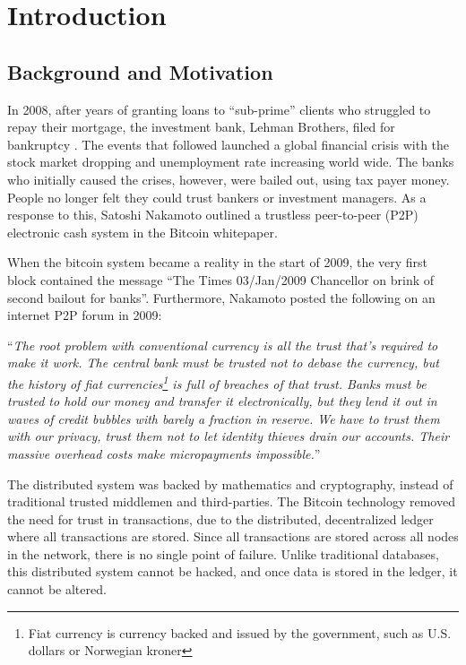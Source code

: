 \chapter{Introduction}
\section{Background and Motivation}
In 2008, after years of granting loans to \enquote{sub-prime} clients who struggled to repay their mortgage, the investment bank, Lehman Brothers, filed for bankruptcy \cite{lehman}. The events that followed launched a global financial crisis with the stock market dropping and unemployment rate increasing world wide. The banks who initially caused the crises, however, were bailed out, using tax payer money. People no longer felt they could trust bankers or investment managers. As a response to this, Satoshi Nakamoto outlined a trustless peer-to-peer (P2P) electronic cash system in the Bitcoin whitepaper. 

When the bitcoin system became a reality in the start of 2009, the very first block contained the message \enquote{The Times 03/Jan/2009 Chancellor on brink of second bailout for banks}. Furthermore, Nakamoto posted the following on an internet P2P forum \cite{nakamoto_trust} in 2009: 

\enquote{\textit{The root problem with conventional currency is all the trust that's required to make it work. The central bank must be trusted not to debase the currency, but the history of fiat currencies\footnote{Fiat currency is currency backed and issued by the government, such as U.S. dollars or Norwegian kroner} is full of breaches of that trust. Banks must be trusted to hold our money and transfer it electronically, but they lend it out in waves of credit bubbles with barely a fraction in reserve. We have to trust them with our privacy, trust them not to let identity thieves drain our accounts. Their massive overhead costs make micropayments impossible.}}

The distributed system was backed by mathematics and cryptography, instead of traditional trusted middlemen and third-parties. The Bitcoin technology removed the need for trust in transactions, due to the distributed, decentralized ledger where all transactions are stored. Since all transactions are stored across all nodes in the network, there is no single point of failure. Unlike traditional databases, this distributed system cannot be hacked, and once data is stored in the ledger, it cannot be altered.

